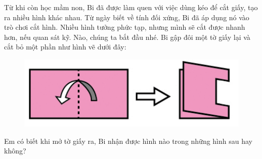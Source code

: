 \graphicspath{ {../choicungbi/gapvacathinh/} }
\begingroup
{} %
\centering
\endgroup
	
\vspace*{15pt}
	
Từ khi còn học mầm non, Bi  đã được làm quen với việc dùng kéo để cắt giấy, tạo ra nhiều hình khác nhau. Từ ngày biết về tính đối xứng, Bi đã áp dụng nó vào trò chơi cắt hình.
Nhiều hình tưởng phức tạp, nhưng mình sẽ cắt được nhanh hơn, nếu quan sát kỹ.
\vskip 0.1cm
Nào, chúng ta bắt đầu nhé.
\vskip 0.1cm
Bi gập đôi một tờ giấy lại và cắt bỏ một phần như hình vẽ dưới đây: 
	\begin{figure}[H]
		\centering
		\centering
		\vspace*{-10pt}
		\includegraphics[scale=0.4]{cat-1}
		\vspace*{-10pt}
	\end{figure}
Em có biết khi mở tờ giấy ra, Bi nhận được hình nào trong những hình sau hay không?
